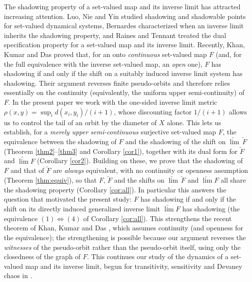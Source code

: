 \documentclass[12pt]{amsart}
\theoremstyle{definition}
\begin{document}
The shadowing property of a set-valued map and its inverse limit has attracted increasing attention. Luo, Nie and Yin \cite{Luo2020} studied shadowing and shadowable points for set-valued dynamical systems, Bernardes \cite{20232} characterized when an inverse limit inherits the shadowing property, and Raines and Tennant \cite{Raines2018} treated the dual specification property for a set-valued map and its inverse limit. Recently, Khan, Kumar and Das \cite{KhanKumarDas} proved that, for an onto \emph{continuous} set-valued map $F$ (and, for the full equivalence with the inverse set-valued map, an \emph{open} one), $F$ has shadowing if and only if the shift on a suitably induced inverse limit system has shadowing. Their argument reverses finite pseudo-orbits and therefore relies essentially on the continuity (equivalently, the uniform upper semi-continuity) of $F$. In the present paper we work with the one-sided inverse limit metric $\rho(x,y)=\sup_{i}d(x_i,y_i)/(i+1)$, whose discounting factor $1/(i+1)$ allows us to control the tail of an orbit by the diameter of $X$ alone. This lets us establish, for a \emph{merely upper semi-continuous} surjective set-valued map $F$, the equivalence between the shadowing of $F$ and the shadowing of the shift on $\underleftarrow{\lim}\,\underleftarrow{F}$ (Theorem \ref{thm2}--\ref{thm3} and Corollary \ref{cor1}), together with its dual form for $\underleftarrow{F}$ and $\underleftarrow{\lim}F$ (Corollary \ref{cor2}). Building on these, we prove that the shadowing of $F$ and that of $\underleftarrow{F}$ are \emph{always} equivalent, with no continuity or openness assumption (Theorem \ref{thm:equiv}), so that $F$, $\underleftarrow{F}$ and the shifts on $\underleftarrow{\lim}\,\underleftarrow{F}$ and $\underleftarrow{\lim}F$ all share the shadowing property (Corollary \ref{cor:all}). In particular this answers the question that motivated the present study: $F$ has shadowing if and only if the shift on its directly induced generalized inverse limit $\underleftarrow{\lim}F$ has shadowing (the equivalence $(1)\Leftrightarrow(4)$ of Corollary \ref{cor:all}). This strengthens the recent theorem of Khan, Kumar and Das \cite{KhanKumarDas}, which assumes continuity (and openness for the equivalence); the strengthening is possible because our argument reverses the \emph{witnesses} of the pseudo-orbit rather than the pseudo-orbit itself, using only the closedness of the graph of $F$. This continues our study of the dynamics of a set-valued map and its inverse limit, begun for transitivity, sensitivity and Devaney chaos in \cite{zhao2023}.
\end{document}
